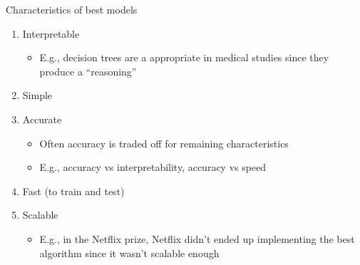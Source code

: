 \documentclass[aspectratio=169, xcolor=dvipsnames]{beamer}
\begin{document}
  \begin{frame}{Characteristics of best models}
    \begin{enumerate}
      \def\labelenumi{\arabic{enumi}.}

      \item Interpretable
        \begin{itemize}
          \item E.g., decision trees are a appropriate in medical studies since they
            produce a ``reasoning''
        \end{itemize}

      \item Simple

      \item Accurate
        \begin{itemize}
          \item Often accuracy is traded off for remaining characteristics

          \item E.g., accuracy vs interpretability, accuracy vs speed
        \end{itemize}

      \item Fast (to train and test)

      \item Scalable
        \begin{itemize}
          \item E.g., in the Netflix prize, Netflix didn't ended up implementing
            the best algorithm since it wasn't scalable enough
        \end{itemize}
    \end{enumerate}
  \end{frame}
\end{document}
